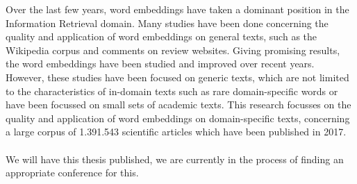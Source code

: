 \documentclass[../../Thesis.tex]{subfiles}
\begin{document}
Over the last few years, word embeddings have taken a dominant position in the Information Retrieval domain. Many studies have been done concerning the quality and application of word embeddings on general texts, such as the Wikipedia corpus and comments on review websites. Giving promising results, the word embeddings have been studied and improved over recent years. However, these studies have been focused on generic texts, which are not limited to the characteristics of in-domain texts such as rare domain-specific words or have been focussed on small sets of academic texts. This research focusses on the quality and application of word embeddings on domain-specific texts, concerning a large corpus of 1.391.543 scientific articles which have been published in 2017.\\
\vspace*{\fill}
\\
We will have this thesis published, we are currently in the process of finding an appropriate conference for this.
\end{document}
